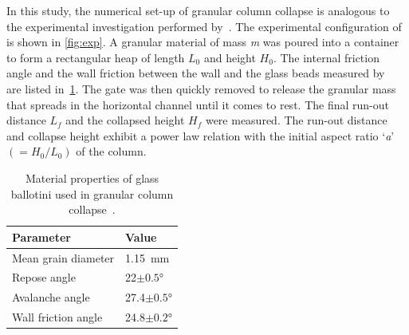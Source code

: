 In this study, the numerical set-up of granular column collapse is analogous to 
the  experimental investigation performed by~\citet{Lajeunesse2004}. The 
experimental configuration of~\citet{Lajeunesse2004} is shown in 
\cref{fig:exp}. A granular material of mass \textit{m} was poured into a 
container to form a rectangular heap of length ${L}_{0}$ and height 
${H}_{0}$. The internal friction angle and the wall friction between the wall 
and the glass beads measured by~\citet{Lajeunesse2004} are listed 
in~\cref{table:mat_prop}. The gate was then quickly removed to release the 
granular mass that spreads in the horizontal channel until it comes to rest. 
The final run-out distance ${L}_{{f}}$ and the collapsed height $H_{{f}}$ were 
measured. The run-out distance and collapse height exhibit a power law relation 
with the initial aspect ratio `\textit{a}' $(=H_{0}/L_{0})$ of the column. 

\begin{table}[tbhp]
\caption{Material properties of glass ballotini used in granular column 
collapse~\citep{Lajeunesse2004}.}
\label{table:mat_prop}
\centering
\begin{tabular}{ll}
\toprule
\textbf{Parameter} & \textbf{Value} \\ \midrule
Mean grain diameter & 1.15~\si{\mm} \\
Repose angle & 22$\pm 0.5$\si{\degree} \\
Avalanche angle & 27.4$\pm 0.5$\si{\degree} \\
Wall friction angle & 24.8$\pm 0.2$\si{\degree}\\
\bottomrule
\end{tabular}
\end{table}


